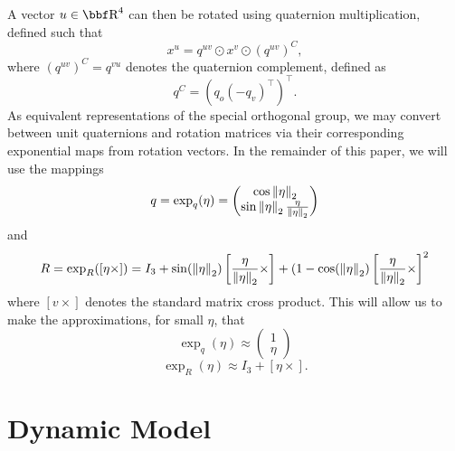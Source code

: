 \documentclass{article}
\begin{document}
A vector $u \in \RR^4$ can then be rotated using quaternion multiplication, defined such that 
\[
x^u = q^{uv} \odot x^v \odot (q^{uv})^C,
\]
where $(q^{uv})^C = q^{vu}$ denotes the quaternion complement, defined as
\[
q^C = (q_o (-q_v)^\top)^\top.
\]
As equivalent representations of the special orthogonal group, we may convert between unit quaternions and rotation matrices via their corresponding exponential maps from rotation vectors. In the remainder of this paper, we will use the mappings 
\begin{equation}
\label{eq:expq}
    q = \exp_q(\eta) = 
    \begin{pmatrix}
\cos \left\lVert\eta\right\rVert_2\\
\sin \left\lVert\eta\right\rVert_2 \frac{\eta}{\left\lVert\eta\right\rVert_2}
\end{pmatrix}
\end{equation}
and
\begin{equation}
\label{eq:expr}
    R = \exp_R([\eta \times]) = I_3 + \sin (\left\lVert\eta\right\rVert_2)\left[\frac{\eta}{\left\lVert\eta\right\rVert_2} \times \right] + (1 - \cos(\left\lVert\eta\right\rVert_2) \left[\frac{\eta}{\left\lVert\eta\right\rVert_2} \times \right]^2
\end{equation}
where $[v \times]$ denotes the standard matrix cross product. This will allow us to make the approximations, for small $\eta$, that
\begin{equation}
\label{eq:expqapprox}
    \exp_q(\eta) \approx \begin{pmatrix}
    1\\
    \eta
    \end{pmatrix}
\end{equation}
\begin{equation}
\label{eq:exprapprox}
    \exp_R(\eta) \approx I_3 + [\eta \times].
\end{equation}



\section{Dynamic Model} \label{sec:dynmod}
\end{document}
